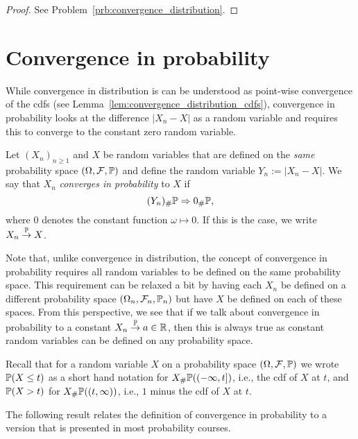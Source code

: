 \begin{proof}
See Problem~\ref{prb:convergence_distribution}.
\end{proof}



\section{Convergence in probability}

While convergence in distribution is can be understood as point-wise convergence of the cdfs (see Lemma~\ref{lem:convergence_distribution_cdfs}), convergence in probability looks at the difference $|X_n - X|$ as a random variable and requires this to converge to the constant zero random variable.

\begin{definition}\label{def:convergence_probability}
Let $(X_n)_{n \ge 1}$ and $X$ be random variables that are defined on the \emph{same} probability space $(\Omega, \mathcal F, \mathbb P)$ and define the random variable $Y_n := |X_n - X|$. We say that $X_n$ \emph{converges in probability} to $X$ if
\[
	(Y_n)_\# \mathbb P \Rightarrow 0_\# \mathbb P,
\] 
where $0$ denotes the constant function $\omega \mapsto 0$. If this is the case, we write $X_n \stackrel{\mathbb P}{\rightarrow} X$.
\end{definition}

\begin{remark}
Note that, unlike convergence in distribution, the concept of convergence in probability requires all random variables to be defined on the same probability space. This requirement can be relaxed a bit by having each $X_n$ be defined on a different probability space $(\Omega_n, \mathcal F_n, \mathbb P_n)$ but have $X$ be defined on each of these spaces. From this perspective, we see that if we talk about convergence in probability to a constant $X_n \stackrel{\mathbb P}{\rightarrow} a \in \mathbb R$, then this is always true as constant random variables can be defined on any probability space.
\end{remark}

Recall that for a random variable $X$ on a probability space $(\Omega, \mathcal F, \mathbb P)$ we wrote $\mathbb P(X \le t)$ as a short hand notation for $X_\# \mathbb P ((-\infty,t])$, i.e., the cdf of $X$ at $t$, and $\mathbb P(X > t)$ for $X_\# \mathbb P ((t,\infty))$, i.e., $1$ minus the cdf of $X$ at $t$.

The following result relates the definition of convergence in probability to a version that is presented in most probability courses.

